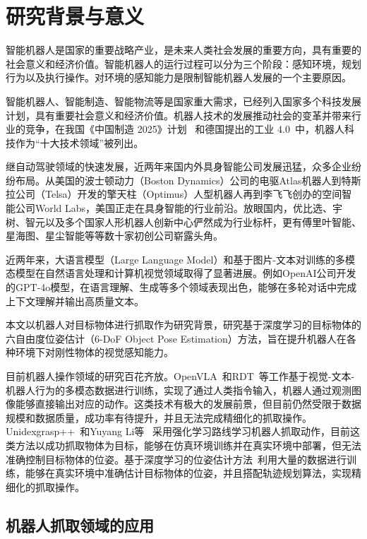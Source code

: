 \section{研究背景与意义}
\par 智能机器人是国家的重要战略产业，是未来人类社会发展的重要方向，具有重要的社会意义和经济价值。智能机器人的运行过程可以分为三个阶段：感知环境，规划行为以及执行操作。对环境的感知能力是限制智能机器人发展的一个主要原因。
\par 智能机器人、智能制造、智能物流等是国家重大需求，已经列入国家多个科技发展计划，具有重要社会意义和经济价值。机器人技术的发展推动社会的变革并带来行业的竞争，在我国《中国制造 2025》计划~\cite{中国制造2025} 和德国提出的工业 4.0~\cite{德国工业4.0}中，机器人科技作为“十大技术领域”被列出。
\par 继自动驾驶领域的快速发展，近两年来国内外具身智能公司发展迅猛，众多企业纷纷布局。从美国的波士顿动力（Boston Dynamics）公司的电驱Atlas机器人到特斯拉公司（Telsa）开发的擎天柱（Optimus）人型机器人再到李飞飞创办的空间智能公司World Labs，美国正走在具身智能的行业前沿。放眼国内，优比选、宇树、智元以及多个国家人形机器人创新中心俨然成为行业标杆，更有傅里叶智能、星海图、星尘智能等等数十家初创公司崭露头角。
\par 近两年来，大语言模型（Large Language Model）和基于图片-文本对训练的多模态模型在自然语言处理和计算机视觉领域取得了显著进展。例如OpenAI公司开发的GPT-4o模型，在语言理解、生成等多个领域表现出色，能够在多轮对话中完成上下文理解并输出高质量文本。
\par 本文以机器人对目标物体进行抓取作为研究背景，研究基于深度学习的目标物体的六自由度位姿估计（6-DoF Object Pose Estimation）方法，旨在提升机器人在各种环境下对刚性物体的视觉感知能力。
\par 目前机器人操作领域的研究百花齐放。OpenVLA~\cite{openvla}和RDT~\cite{liu2024rdt}等工作基于视觉-文本-机器人行为的多模态数据进行训练，实现了通过人类指令输入，机器人通过观测图像能够直接输出对应的动作。这类技术有极大的发展前景，但目前仍然受限于数据规模和数据质量，成功率有待提升，并且无法完成精细化的抓取操作。Unidexgrasp++~\cite{wan2023unidexgrasp++}和Yuyang Li等~\cite{li2024grasp} 采用强化学习路线学习机器人抓取动作，目前这类方法以成功抓取物体为目标，能够在仿真环境训练并在真实环境中部署，但无法准确控制目标物体的位姿。基于深度学习的位姿估计方法~\cite{hodan2024bop}利用大量的数据进行训练，能够在真实环境中准确估计目标物体的位姿，并且搭配轨迹规划算法，实现精细化的抓取操作。
\subsection{机器人抓取领域的应用}
